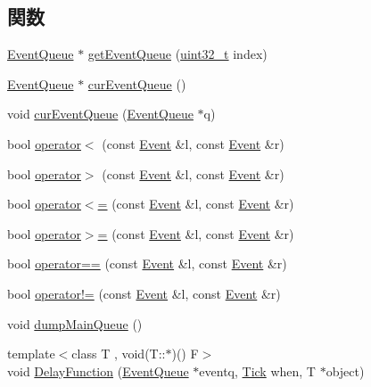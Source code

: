 \subsection*{関数}
\begin{DoxyCompactItemize}
\item 
\hyperlink{classEventQueue}{EventQueue} $\ast$ \hyperlink{eventq_8hh_a5b4fbd623a1babda7d35802241f5f6cf}{getEventQueue} (\hyperlink{Type_8hh_a435d1572bf3f880d55459d9805097f62}{uint32\_\-t} index)
\item 
\hyperlink{classEventQueue}{EventQueue} $\ast$ \hyperlink{eventq_8hh_a64a8603a1af7020a19d30c54152fdcb2}{curEventQueue} ()
\item 
void \hyperlink{eventq_8hh_aa002a8d75c873915e60d96ac255f9df7}{curEventQueue} (\hyperlink{classEventQueue}{EventQueue} $\ast$q)
\item 
bool \hyperlink{eventq_8hh_a3c178da5a2521e397a938853b0381cfe}{operator$<$} (const \hyperlink{classEvent}{Event} \&l, const \hyperlink{classEvent}{Event} \&r)
\item 
bool \hyperlink{eventq_8hh_a4bec4ae1c2599b058e50d02e0bb08962}{operator$>$} (const \hyperlink{classEvent}{Event} \&l, const \hyperlink{classEvent}{Event} \&r)
\item 
bool \hyperlink{eventq_8hh_a321ab1717492451522fed22375ae8363}{operator$<$=} (const \hyperlink{classEvent}{Event} \&l, const \hyperlink{classEvent}{Event} \&r)
\item 
bool \hyperlink{eventq_8hh_a53cd3371f557c2fce6b6a65fc06d4d4e}{operator$>$=} (const \hyperlink{classEvent}{Event} \&l, const \hyperlink{classEvent}{Event} \&r)
\item 
bool \hyperlink{eventq_8hh_aa242d3b194771eaf0fd66a3c7b646816}{operator==} (const \hyperlink{classEvent}{Event} \&l, const \hyperlink{classEvent}{Event} \&r)
\item 
bool \hyperlink{eventq_8hh_a88186b54fd68bd48fb160ba30c0242ee}{operator!=} (const \hyperlink{classEvent}{Event} \&l, const \hyperlink{classEvent}{Event} \&r)
\item 
void \hyperlink{eventq_8hh_afa9cf950f7afca6dc9b1fc2328df2d43}{dumpMainQueue} ()
\item 
{\footnotesize template$<$class T , void(T::$\ast$)() F$>$ }\\void \hyperlink{eventq_8hh_a9992bd1a54709fbb3d7e0e8ab62702c0}{DelayFunction} (\hyperlink{classEventQueue}{EventQueue} $\ast$eventq, \hyperlink{base_2types_8hh_a5c8ed81b7d238c9083e1037ba6d61643}{Tick} when, T $\ast$object)
\end{DoxyCompactItemize}
